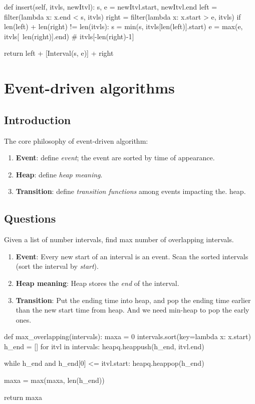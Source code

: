 \begin{python}
def insert(self, itvls, newItvl):
    s, e = newItvl.start, newItvl.end
    left = filter(lambda x: x.end < s, itvls)
    right = filter(lambda x: x.start > e, itvls)
    if len(left) + len(right) != len(itvls):
        s = min(s, itvls[len(left)].start)
        e = max(e, itvls[~len(right)].end)
        # itvls[-len(right)-1]

    return left + [Interval(s, e)] + right
\end{python}

\section{Event-driven algorithms}
\subsection{Introduction}
The core philosophy of event-driven algorithm:
\begin{enumerate}
\item \textbf{Event}: define \textit{event}; the event are sorted by time of appearance.
\item \textbf{Heap}: define \textit{heap meaning}.
\item \textbf{Transition}: define \textit{transition functions} among events impacting the.
heap. 
\end{enumerate} 

\subsection{Questions}
 Given a list of number intervals, find max number of overlapping
intervals. 
\begin{enumerate}
\item \textbf{Event}: Every new start of an interval is an event. Scan the sorted intervals (sort the interval by \textit{start}).
\item \textbf{Heap meaning}: Heap stores the \textit{end} of the interval. 
\item \textbf{Transition}: Put the ending time into heap, and pop the ending time earlier than the new start time from heap. And we need min-heap to pop the early ones.
\end{enumerate}
\newpage
\begin{python}
def max_overlapping(intervals):
    maxa = 0
    intervals.sort(key=lambda x: x.start)
    h_end = []
    for itvl in intervals:
        heapq.heappush(h_end, itvl.end)
        
        while h_end and h_end[0] <= itvl.start:
            heapq.heappop(h_end)

        maxa = max(maxa, len(h_end))

    return maxa
\end{python}

